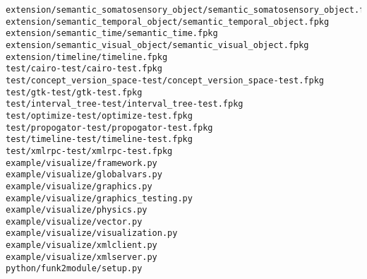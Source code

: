 \begin{lstlisting}
extension/semantic_somatosensory_object/semantic_somatosensory_object.fpkg
extension/semantic_temporal_object/semantic_temporal_object.fpkg
extension/semantic_time/semantic_time.fpkg
extension/semantic_visual_object/semantic_visual_object.fpkg
extension/timeline/timeline.fpkg
test/cairo-test/cairo-test.fpkg
test/concept_version_space-test/concept_version_space-test.fpkg
test/gtk-test/gtk-test.fpkg
test/interval_tree-test/interval_tree-test.fpkg
test/optimize-test/optimize-test.fpkg
test/propogator-test/propogator-test.fpkg
test/timeline-test/timeline-test.fpkg
test/xmlrpc-test/xmlrpc-test.fpkg
example/visualize/framework.py
example/visualize/globalvars.py
example/visualize/graphics.py
example/visualize/graphics_testing.py
example/visualize/physics.py
example/visualize/vector.py
example/visualize/visualization.py
example/visualize/xmlclient.py
example/visualize/xmlserver.py
python/funk2module/setup.py
\end{lstlisting}
